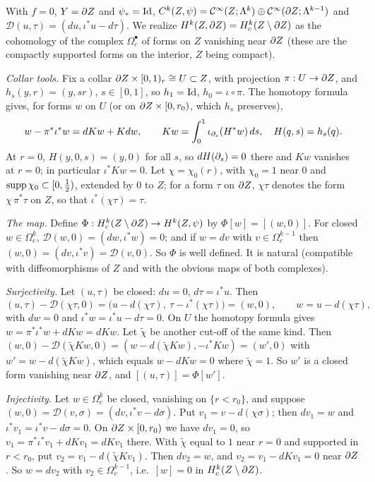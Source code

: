 With $f=0$, $Y=\partial Z$ and $\psi_*=\operatorname{Id}$, $C^k(Z,\psi)=\mathcal{C}^\infty(Z;\Lambda^k)\oplus
\mathcal{C}^\infty(\partial Z;\Lambda^{k-1})$ and $\mathcal D(u,\tau)=(du,\iota^*u-d\tau)$. We realize
$H^k(Z,\partial Z)=H^k_c(Z\setminus\partial Z)$ as the cohomology of the complex
$\Omega_c^\bullet$ of forms on $Z$ vanishing near $\partial Z$ (these are the compactly
supported forms on the interior, $Z$ being compact).

\emph{Collar tools.} Fix a collar $\partial Z\times[0,1)_r\cong U\subset Z$, with
projection $\pi:U\to\partial Z$, and $h_s(y,r)=(y,sr)$, $s\in[0,1]$, so $h_1=\operatorname{Id}$,
$h_0=\iota\circ\pi$. The homotopy formula gives, for forms $w$ on $U$ (or on
$\partial Z\times[0,r_0)$, which $h_s$ preserves),
\begin{equation*}
  w-\pi^*\iota^*w=dKw+Kdw,\qquad Kw=\int_0^1\iota_{\partial_s}(H^*w)\,ds,\quad
  H(q,s)=h_s(q).
\end{equation*}
At $r=0$, $H(y,0,s)=(y,0)$ for all $s$, so $dH(\partial_s)=0$ there and $Kw$ vanishes at
$r=0$; in particular $\iota^*Kw=0$. Let $\chi=\chi_0(r)$, with $\chi_0=1$ near $0$ and
$\operatorname{supp}\chi_0\subset[0,\frac12)$, extended by $0$ to $Z$; for a form $\tau$ on $\partial Z$,
$\chi\tau$ denotes the form $\chi\,\pi^*\tau$ on $Z$, so that $\iota^*(\chi\tau)=\tau$.

\emph{The map.} Define $\Phi:H^k_c(Z\setminus\partial Z)\to H^k(Z,\psi)$ by
$\Phi[w]=[(w,0)]$. For closed $w\in\Omega^k_c$, $\mathcal D(w,0)=(dw,\iota^*w)=0$; and if
$w=dv$ with $v\in\Omega_c^{k-1}$ then $(w,0)=(dv,\iota^*v)=\mathcal D(v,0)$. So
$\Phi$ is well defined. It is natural (compatible with diffeomorphisms of $Z$ and
with the obvious maps of both complexes).

\emph{Surjectivity.} Let $(u,\tau)$ be closed: $du=0$, $d\tau=\iota^*u$. Then
\begin{equation*}
  (u,\tau)-\mathcal D(\chi\tau,0)=\bigl(u-d(\chi\tau),\ \tau-\iota^*(\chi\tau)\bigr)
  =(w,0),\qquad w=u-d(\chi\tau),
\end{equation*}
with $dw=0$ and $\iota^*w=\iota^*u-d\tau=0$. On $U$ the homotopy formula gives
$w=\pi^*\iota^*w+dKw=dKw$. Let $\tilde\chi$ be another cut-off of the same kind.
Then $(w,0)-\mathcal D(\tilde\chi Kw,0)=(w-d(\tilde\chi Kw),-\iota^*Kw)=(w',0)$ with
$w'=w-d(\tilde\chi Kw)$, which equals $w-dKw=0$ where $\tilde\chi=1$. So $w'$ is a
closed form vanishing near $\partial Z$, and $[(u,\tau)]=\Phi[w']$.

\emph{Injectivity.} Let $w\in\Omega^k_c$ be closed, vanishing on $\{r<r_0\}$, and
suppose $(w,0)=\mathcal D(v,\sigma)=(dv,\iota^*v-d\sigma)$. Put
$v_1=v-d(\chi\sigma)$; then $dv_1=w$ and $\iota^*v_1=\iota^*v-d\sigma=0$. On
$\partial Z\times[0,r_0)$ we have $dv_1=0$, so $v_1=\pi^*\iota^*v_1+dKv_1=dKv_1$ there. With
$\tilde\chi$ equal to $1$ near $r=0$ and supported in $r<r_0$, put
$v_2=v_1-d(\tilde\chi Kv_1)$. Then $dv_2=w$, and $v_2=v_1-dKv_1=0$ near $\partial Z$. So
$w=dv_2$ with $v_2\in\Omega^{k-1}_c$, i.e.\ $[w]=0$ in $H^k_c(Z\setminus\partial Z)$.

